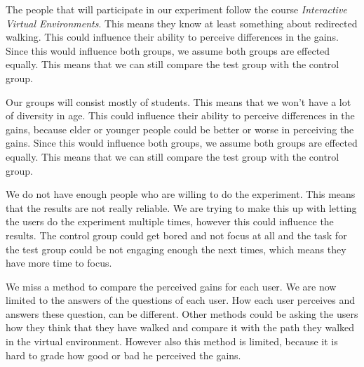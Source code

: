 The people that will participate in our experiment follow the course \emph{Interactive Virtual Environments}.
This means they know at least something about redirected walking.
This could influence their ability to perceive differences in the gains.
Since this would influence both groups, we assume both groups are effected equally.
This means that we can still compare the test group with the control group.

Our groups will consist mostly of students.
This means that we won't have a lot of diversity in age.
This could influence their ability to perceive differences in the gains, because elder or younger people could be better or worse in perceiving the gains.
Since this would influence both groups, we assume both groups are effected equally.
This means that we can still compare the test group with the control group.

We do not have enough people who are willing to do the experiment.
This means that the results are not really reliable.
We are trying to make this up with letting the  users do the experiment multiple times,  however this could influence the results.
The control group could get bored and not focus at all and the task for the test group could be not engaging enough the next times, which means they have more time to focus.

We miss a method to compare the perceived gains for each user.
We are now limited to the answers of the questions of each user.
How each user perceives and answers these question, can be different.
Other methods could be asking the users how they think that they have walked and compare it with the path they walked in the virtual environment.
However also this method is limited, because it is hard to grade how good or bad he perceived the gains.
